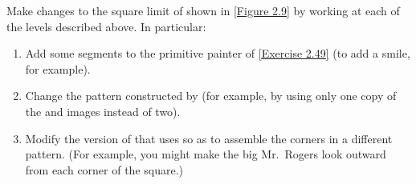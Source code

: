 \begin{exercise}
	\label{Exercise 2.52}
	Make changes to the square limit of  shown in \cref{Figure 2.9} by working at each of the levels described above.
	In particular:
	\begin{enumerate}[label = \alph*., leftmargin = *]

		\item
			Add some segments to the primitive  painter of \cref{Exercise 2.49} (to add a smile, for example).

		\item
			Change the pattern constructed by  (for example, by using only one copy of the  and  images instead of two).

		\item
			Modify the version of  that uses  so as to assemble the corners in a different pattern.
			(For example, you might make the big Mr.~Rogers look outward from each corner of the square.)

	\end{enumerate}
\end{exercise}
